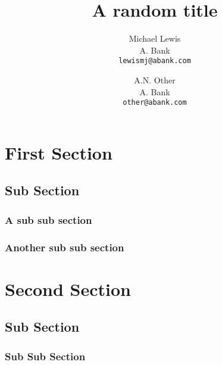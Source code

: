 \documentclass[twocolumn]{article}
\title{A random title}
\author{Michael Lewis\\
A. Bank\\
{\tt\small lewismj@abank.com}
\and
A.N. Other\\
A. Bank\\
{\tt\small other@abank.com}
}
\begin{document}
\maketitle

\begin{abstract}
\lipsum[1-1]
\end{abstract}

\tableofcontents

\section{First Section}
	\lipsum[1-2]
	\subsection{Sub Section}
		\subsubsection{A sub sub section}
			\lipsum[1-1]
	\subsubsection{Another sub sub section}
		\lipsum[1-1]
\section{Second Section}
	\subsection{Sub Section}
		\subsubsection{Sub Sub Section}
			\lipsum[1-2]
			
\end{document}
